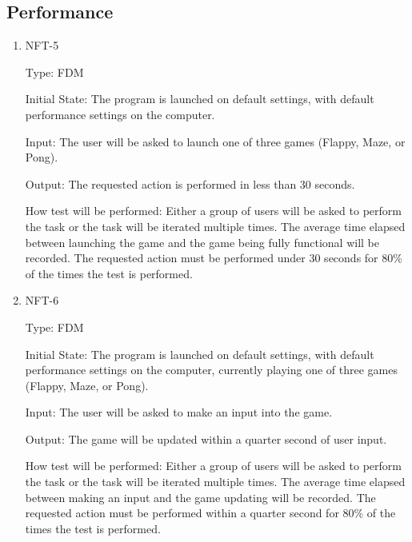\documentclass[12pt, titlepage]{article}
\begin{document}
\subsection{Performance}
\begin{enumerate}
\item{NFT-5\\}

Type: FDM
					
Initial State: The program is launched on default settings, with default performance settings on the computer. 
					
Input: The user will be asked to launch one of three games (Flappy, Maze, or Pong).
					
Output: The requested action is performed in less than 30 seconds.

How test will be performed: Either a group of users will be asked to perform the task or the task will be iterated multiple times. The average time elapsed between launching the game and the game being fully functional will be recorded. The requested action must be performed under 30 seconds for 80\%  of the times the test is performed.

\item{NFT-6\\}

Type: FDM
					
Initial State: The program is launched on default settings, with default performance settings on the computer, currently playing one of three games (Flappy, Maze, or Pong).
					
Input: The user will be asked to make an input into the game.
					
Output: The game will be updated within a quarter second of user input.

How test will be performed: Either a group of users will be asked to perform the task or the task will be iterated multiple times. The average time elapsed between making an input and the game updating will be recorded. The requested action must be performed within a quarter second for 80\%  of the times the test is performed.
\end{enumerate}
\end{document}

